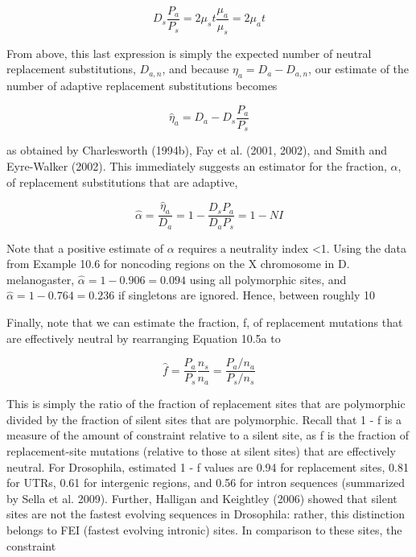 \documentclass{article}
\begin{document}
\begin{equation}
D_{s}\frac{P_{a}}{P_{s}}=2\mu_{s}t\frac{\mu_{a}}{\mu_{s}}=2\mu_{a}t
\tag{10.7a}
\label{eq:10_7a}
\end{equation}

From above, this last expression is simply the expected number of neutral replacement substitutions,  $ D_{a,n} $, and because  $ \eta_{a}=D_{a}-D_{a,n} $, our estimate of the number of adaptive replacement substitutions becomes

\begin{equation}
\widehat{\eta}_{a}=D_{a}-D_{s}\frac{P_{a}}{P_{s}}
\tag{10.7b}
\label{eq:10_7b}
\end{equation}

as obtained by Charlesworth (1994b), Fay et al. (2001, 2002), and Smith and Eyre-Walker (2002). This immediately suggests an estimator for the fraction,  $ \alpha $, of replacement substitutions that are adaptive,

\begin{equation}
\widehat{\alpha}=\frac{\widehat{\eta}_{a}}{D_{a}}=1-\frac{D_{s}P_{a}}{D_{a}P_{s}}=1-N I
\tag{10.7c}
\label{eq:10_7c}
\end{equation}

Note that a positive estimate of  $ \alpha $ requires a neutrality index <1. Using the data from Example 10.6 for noncoding regions on the X chromosome in D. melanogaster,  $ \hat{\alpha} = 1 - 0.906 = 0.094 $ using all polymorphic sites, and  $ \hat{\alpha} = 1 - 0.764 = 0.236 $ if singletons are ignored. Hence, between roughly 10%

Finally, note that we can estimate the fraction, f, of replacement mutations that are effectively neutral by rearranging Equation 10.5a to

\begin{equation}
\widehat{f}=\frac{P_{a}}{P_{s}}\frac{n_{s}}{n_{a}}=\frac{P_{a}/n_{a}}{P_{s}/n_{s}}
\tag{10.7d}
\label{eq:10_7d}
\end{equation}

This is simply the ratio of the fraction of replacement sites that are polymorphic divided by the fraction of silent sites that are polymorphic. Recall that 1 - f is a measure of the amount of constraint relative to a silent site, as f is the fraction of replacement-site mutations (relative to those at silent sites) that are effectively neutral. For Drosophila, estimated 1 - f values are 0.94 for replacement sites, 0.81 for UTRs, 0.61 for intergenic regions, and 0.56 for intron sequences (summarized by Sella et al. 2009). Further, Halligan and Keightley (2006) showed that silent sites are not the fastest evolving sequences in Drosophila: rather, this distinction belongs to FEI (fastest evolving intronic) sites. In comparison to these sites, the constraint
\end{document}
